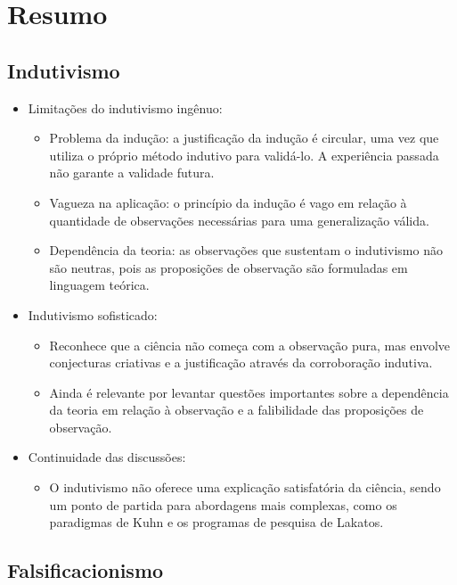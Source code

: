 \section{Resumo}


\subsection{Indutivismo}

\begin{itemize}
    \item Limitações do indutivismo ingênuo:
    \begin{itemize}
        \item Problema da indução: a justificação da indução é circular, uma vez que utiliza o próprio método indutivo para validá-lo. A experiência passada não garante a validade futura.
        \item Vagueza na aplicação: o princípio da indução é vago em relação à quantidade de observações necessárias para uma generalização válida.
        \item Dependência da teoria: as observações que sustentam o indutivismo não são neutras, pois as proposições de observação são formuladas em linguagem teórica.
    \end{itemize}
    \item Indutivismo sofisticado:
    \begin{itemize}
        \item Reconhece que a ciência não começa com a observação pura, mas envolve conjecturas criativas e a justificação através da corroboração indutiva.
        \item Ainda é relevante por levantar questões importantes sobre a dependência da teoria em relação à observação e a falibilidade das proposições de observação.
    \end{itemize}
    \item Continuidade das discussões:
    \begin{itemize}
        \item O indutivismo não oferece uma explicação satisfatória da ciência, sendo um ponto de partida para abordagens mais complexas, como os paradigmas de Kuhn e os programas de pesquisa de Lakatos.
    \end{itemize}
\end{itemize}

\subsection{Falsificacionismo}

